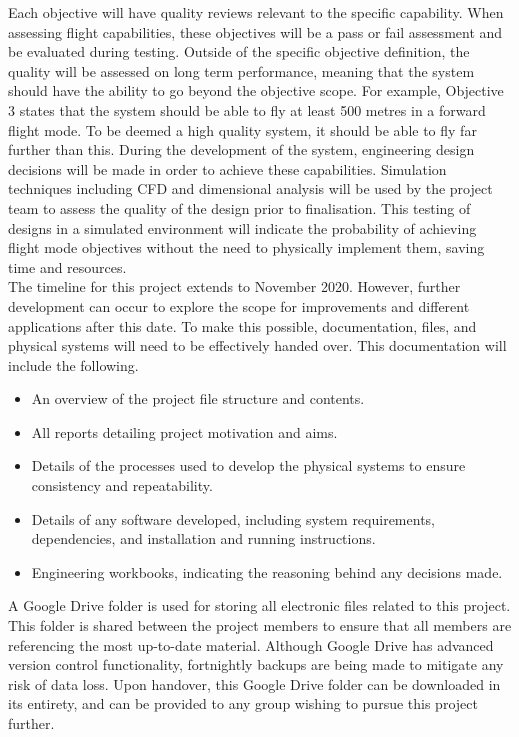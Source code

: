 \begin{appendices}
Each objective will have quality reviews relevant to the specific capability. When assessing flight capabilities, these objectives will be a pass or fail assessment and be evaluated during testing. Outside of the specific objective definition, the quality will be assessed on long term performance, meaning that the system should have the ability to go beyond the objective scope. For example, Objective 3 states that the system should be able to fly at least 500 metres in a forward flight mode. To be deemed a high quality system, it should be able to fly far further than this. During the development of the system, engineering design decisions will be made in order to achieve these capabilities. Simulation techniques including CFD and dimensional analysis will be used by the project team to assess the quality of the design prior to finalisation. This testing of designs in a simulated environment will indicate the probability of achieving flight mode objectives without the need to physically implement them, saving time and resources.\\

The timeline for this project extends to November 2020. However, further development can occur to explore the scope for improvements and different applications after this date. To make this possible, documentation, files, and physical systems will need to be effectively handed over. This documentation will include the following.
\begin{itemize}
    \item An overview of the project file structure and contents.
    \item All reports detailing project motivation and aims.
    \item Details of the processes used to develop the physical systems to ensure consistency and repeatability.
    \item Details of any software developed, including system requirements, dependencies, and installation and running instructions.
    \item Engineering workbooks, indicating the reasoning behind any decisions made.
\end{itemize}
A Google Drive folder is used for storing all electronic files related to this project. This folder is shared between the project members to ensure that all members are referencing the most up-to-date material. Although Google Drive has advanced version control functionality, fortnightly backups are being made to mitigate any risk of data loss. Upon handover, this Google Drive folder can be downloaded in its entirety, and can be provided to any group wishing to pursue this project further.\\


\end{appendices}
